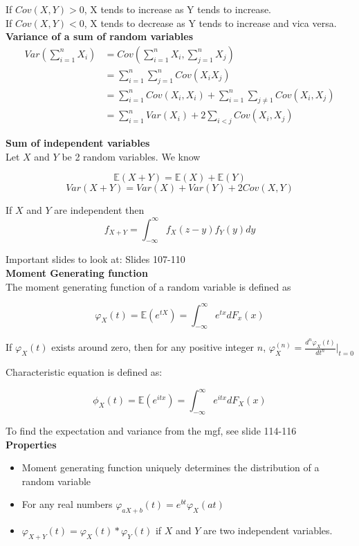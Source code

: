 If $Cov(X,Y) > 0$, X tends to increase as Y tends to increase.\\

If $Cov(X,Y) < 0$, X tends to decrease as Y tends to increase and vica versa.\\

\textbf{Variance of a sum of random variables}\\
\begin{align*}
Var(\sum_{i=1}^n X_i) &= Cov (\sum_{i=1}^n X_i, \sum_{j=1}^n X_j)\\
&= \sum_{i=1}^n \sum_{j=1}^n Cov(X_i X_j) \\
&= \sum_{i=1}^n Cov(X_i, X_i) + \sum_{i=1}^n \sum_{j \neq 1} Cov(X_i,X_j)\\
&= \sum_{i=1}^n Var(X_i) + 2 \sum_{i<j} Cov(X_i,X_j)
\end{align*}

\textbf{Sum of independent variables}\\
Let $X$ and $Y$ be 2 random variables. We know

$$\mathbb{E}(X+Y) = \mathbb{E}(X)+ \mathbb{E}(Y)$$
$$Var(X+Y) = Var(X)+Var(Y)+2Cov(X,Y)$$

If $X$ and $Y$ are independent then
$$f_{X+Y} = \int_{-\infty}^{\infty} f_X(z-y) f_Y(y) dy$$

Important slides to look at: Slides 107-110\\

\textbf{Moment Generating function}\\
The moment generating function of a random variable is defined as

$$\varphi_X(t)  = \mathbb{E}(e^{tX}) = \int_{-\infty}^{\infty} e^{tx} dF_x(x)$$

If $\varphi_X (t)$ exists around zero, then for any positive integer $n$, $\varphi_X^{(n)} = \frac{d^n \varphi_X(t)}{dt^n}|_{t=0}$

Characteristic equation is defined as:

$$\phi_X(t) = \mathbb{E}(e^{itx}) = \int_{-\infty}^{\infty} e^{itx} dF_X(x)$$

To find the expectation and variance from the mgf, see slide 114-116\\

\textbf{Properties}\\
\begin{itemize}
	\item Moment generating function uniquely determines the distribution of a random variable
	\item For any real numbers $\varphi_{aX+b}(t) = e^{bt} \varphi_X(at)$
	\item $\varphi_{X+Y}(t) = \varphi_X(t) * \varphi_Y(t)$ if $X$ and $Y$ are two independent variables.
\end{itemize}

